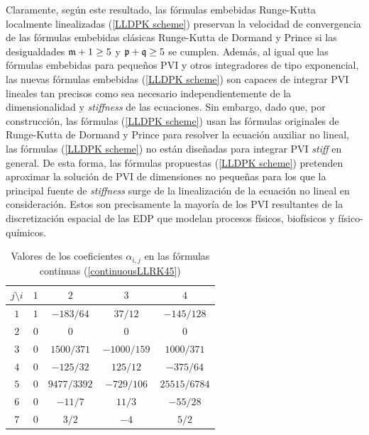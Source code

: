 Claramente, según este resultado, las fórmulas embebidas Runge-Kutta localmente linealizadas (\ref{LLDPK scheme}) preservan la velocidad de convergencia de las fórmulas embebidas clásicas Runge-Kutta de Dormand y Prince si las desigualdades $\mathfrak{m}+1 \ge 5 $ y $\mathfrak{p}+\mathfrak{q} \ge 5$ se cumplen. Además, al igual que las fórmulas embebidas para pequeños PVI y otros integradores de tipo exponencial, las nuevas fórmulas embebidas (\ref{LLDPK scheme}) son capaces de integrar PVI lineales tan precisos como sea necesario independientemente de la dimensionalidad y \textit{stiffness} de las ecuaciones. Sin embargo, dado que, por construcción, las fórmulas (\ref{LLDPK scheme}) usan las fórmulas originales de Runge-Kutta de Dormand y Prince para resolver la ecuación auxiliar no lineal, las fórmulas (\ref{LLDPK scheme}) no están diseñadas para integrar PVI \textit{stiff} en general. De esta forma, las fórmulas propuestas (\ref{LLDPK scheme}) pretenden aproximar la solución de PVI de dimensiones no pequeñas para los que la principal fuente de \textit{stiffness} surge de la linealización de la ecuación no lineal en consideración. Estos son precisamente la mayoría de los PVI resultantes de la discretización espacial de las EDP que modelan procesos físicos, biofísicos y físico-químicos.
\begin{table}[htb]
	\caption{ Valores de los coeficientes $\alpha _{i,j}$ en las fórmulas continuas (\ref{continuousLLRK45})\label{Table continuous RK}}
	\centering
	\begin{tabular}{ccccc}
		\hline
		$j\setminus i$ & $1$ & $2$ & $3$ & $4$ \\
		\hline
		$1$ & $1$ & $-183/64$ & $37/12$ & $-145/128$ \\
		$2$ & $0$ & $0$ & $0$ & $0$ \\
		$3$ & $0$ & $1500/371$ & $-1000/159$ & $1000/371$ \\
		$4$ & $0$ & $-125/32$ & $125/12$ & $-375/64$ \\
		$5$ & $0$ &	$9477/3392$ & $-729/106$ & $25515/6784$ \\
		$6$ & $0$ &	$-11/7$ & $11/3$ & $-55/28$ \\
		$7$ & $0$ & $3/2$ & $-4$ & $5/2$ \\
		\hline
	\end{tabular}
\end{table}

